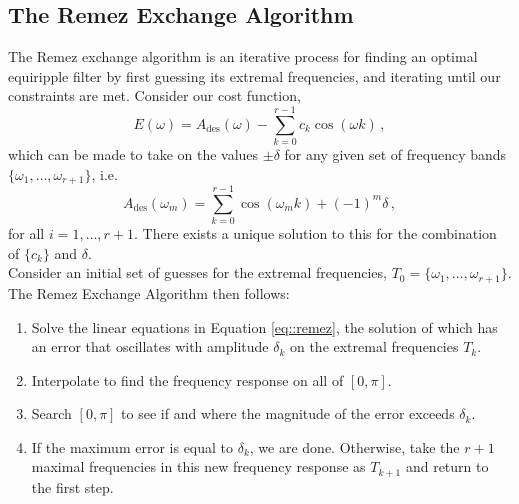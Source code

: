 \subsection{The Remez Exchange Algorithm}
%
The Remez exchange algorithm is an iterative process for finding
an optimal equiripple filter by first guessing its extremal
frequencies, and iterating until our constraints are met. Consider
our cost function,
%
\begin{displaymath}
  E(\omega) = A_\mathrm{des}(\omega) - \sum_{k=0}^{r-1}c_k\cos(\omega k) \,,
\end{displaymath}
%
which can be made to take on the values $\pm\delta$ for any given set
of frequency bands $\{\omega_1,\hdots,\omega_{r+1}\}$, i.e.
%
\begin{equation}\label{eq::remez}
  A_\mathrm{des}(\omega_m) = \sum_{k=0}^{r-1}\cos(\omega_m k) + (-1)^m\delta \,,
\end{equation}
%
for all $i = 1, \hdots, r+1$. There exists a unique solution to this
for the combination of $\{c_k\}$ and $\delta$.\\
%
Consider an initial set of guesses for the extremal frequencies,
$T_0 = \{\omega_1,\hdots,\omega_{r+1}\}$. The Remez Exchange Algorithm
then follows:
%
\begin{enumerate}
\item Solve the linear equations in Equation \ref{eq::remez}, the solution of
  which has an error that oscillates with amplitude $\delta_k$ on the
  extremal frequencies $T_k$.
\item Interpolate to find the frequency response on all of $[0,\pi]$.
\item Search $[0,\pi]$ to see if and where the magnitude of the error
  exceeds $\delta_k$.
\item If the maximum error is equal to $\delta_k$, we are done. Otherwise,
  take the $r+1$ maximal frequencies in this new frequency response as
  $T_{k+1}$ and return to the first step.
\end{enumerate}
%
